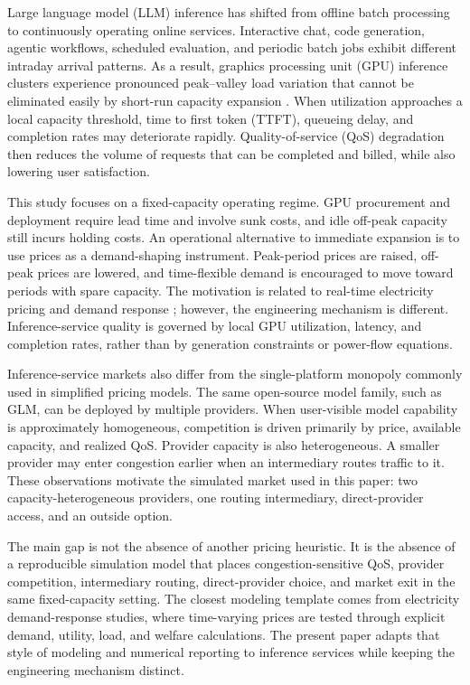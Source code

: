 \documentclass[11pt,a4paper]{article}
\begin{document}
Large language model (LLM) inference has shifted from offline batch processing to continuously operating online services. Interactive chat, code generation, agentic workflows, scheduled evaluation, and periodic batch jobs exhibit different intraday arrival patterns. As a result, graphics processing unit (GPU) inference clusters experience pronounced peak--valley load variation that cannot be eliminated easily by short-run capacity expansion \cite{crankshaw2017clipper,gujarati2020clockwork,yu2022orca,kwon2023pagedattention,agrawal2024sarathiserve}. When utilization approaches a local capacity threshold, time to first token (TTFT), queueing delay, and completion rates may deteriorate rapidly. Quality-of-service (QoS) degradation then reduces the volume of requests that can be completed and billed, while also lowering user satisfaction.

This study focuses on a fixed-capacity operating regime. GPU procurement and deployment require lead time and involve sunk costs, and idle off-peak capacity still incurs holding costs. An operational alternative to immediate expansion is to use prices as a demand-shaping instrument. Peak-period prices are raised, off-peak prices are lowered, and time-flexible demand is encouraged to move toward periods with spare capacity. The motivation is related to real-time electricity pricing and demand response \cite{schweppe1988spot,borenstein2005long,albadi2008summary,faruqui2010household,siano2014demand}; however, the engineering mechanism is different. Inference-service quality is governed by local GPU utilization, latency, and completion rates, rather than by generation constraints or power-flow equations.

Inference-service markets also differ from the single-platform monopoly commonly used in simplified pricing models. The same open-source model family, such as GLM, can be deployed by multiple providers. When user-visible model capability is approximately homogeneous, competition is driven primarily by price, available capacity, and realized QoS. Provider capacity is also heterogeneous. A smaller provider may enter congestion earlier when an intermediary routes traffic to it. These observations motivate the simulated market used in this paper: two capacity-heterogeneous providers, one routing intermediary, direct-provider access, and an outside option.

The main gap is not the absence of another pricing heuristic. It is the absence of a reproducible simulation model that places congestion-sensitive QoS, provider competition, intermediary routing, direct-provider choice, and market exit in the same fixed-capacity setting. The closest modeling template comes from electricity demand-response studies, where time-varying prices are tested through explicit demand, utility, load, and welfare calculations. The present paper adapts that style of modeling and numerical reporting to inference services while keeping the engineering mechanism distinct.
\end{document}
